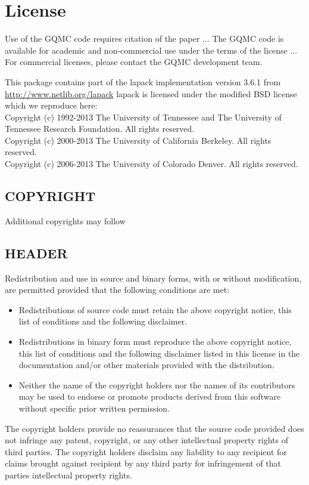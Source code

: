 \section*{License}
Use of the GQMC code requires citation of the paper ...
The GQMC code is available for academic and non-commercial use under the terms of the license ...
For commercial licenses, please contact the GQMC development team. 

This package contains part of the lapack implementation version 3.6.1 from \url{http://www.netlib.org/lapack}
lapack is licensed under the modified BSD license which we reproduce here:\\

Copyright (c) 1992-2013 The University of Tennessee and The University
                        of Tennessee Research Foundation.  All rights
                        reserved.\\
Copyright (c) 2000-2013 The University of California Berkeley. All
                        rights reserved.\\
Copyright (c) 2006-2013 The University of Colorado Denver.  All rights
                        reserved.

\subsection*{COPYRIGHT}

Additional copyrights may follow

\subsection*{HEADER}

Redistribution and use in source and binary forms, with or without
modification, are permitted provided that the following conditions are
met:\\

\begin{itemize}

\item Redistributions of source code must retain the above copyright
  notice, this list of conditions and the following disclaimer.

\item Redistributions in binary form must reproduce the above copyright
  notice, this list of conditions and the following disclaimer listed
  in this license in the documentation and/or other materials
  provided with the distribution.

\item Neither the name of the copyright holders nor the names of its
  contributors may be used to endorse or promote products derived from
  this software without specific prior written permission.
\end{itemize}
The copyright holders provide no reassurances that the source code
provided does not infringe any patent, copyright, or any other
intellectual property rights of third parties.  The copyright holders
disclaim any liability to any recipient for claims brought against
recipient by any third party for infringement of that parties
intellectual property rights.\\

